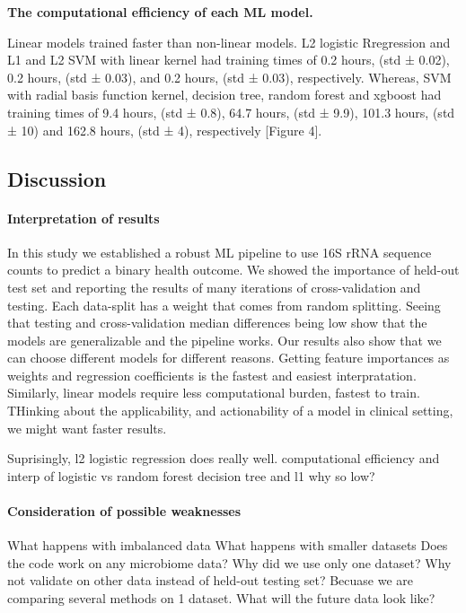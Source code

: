 \documentclass[11pt,]{article}
\let\oldparagraph\paragraph
\renewcommand{\paragraph}[1]{\oldparagraph{#1}\mbox{}}
\begin{document}
\textbf{The computational efficiency of each ML model.}

Linear models trained faster than non-linear models. L2 logistic
Rregression and L1 and L2 SVM with linear kernel had training times of
0.2 hours, (std ± 0.02), 0.2 hours, (std ± 0.03), and 0.2 hours, (std ±
0.03), respectively. Whereas, SVM with radial basis function kernel,
decision tree, random forest and xgboost had training times of 9.4
hours, (std ± 0.8), 64.7 hours, (std ± 9.9), 101.3 hours, (std ± 10) and
162.8 hours, (std ± 4), respectively {[}Figure 4{]}.

\subsection{Discussion}\label{discussion}

\paragraph{Interpretation of results}\label{interpretation-of-results}

In this study we established a robust ML pipeline to use 16S rRNA
sequence counts to predict a binary health outcome. We showed the
importance of held-out test set and reporting the results of many
iterations of cross-validation and testing. Each data-split has a weight
that comes from random splitting. Seeing that testing and
cross-validation median differences being low show that the models are
generalizable and the pipeline works. Our results also show that we can
choose different models for different reasons. Getting feature
importances as weights and regression coefficients is the fastest and
easiest interpratation. Similarly, linear models require less
computational burden, fastest to train. THinking about the
applicability, and actionability of a model in clinical setting, we
might want faster results.

Suprisingly, l2 logistic regression does really well. computational
efficiency and interp of logistic vs random forest decision tree and l1
why so low?

\paragraph{Consideration of possible
weaknesses}\label{consideration-of-possible-weaknesses}

What happens with imbalanced data What happens with smaller datasets
Does the code work on any microbiome data? Why did we use only one
dataset? Why not validate on other data instead of held-out testing set?
Becuase we are comparing several methods on 1 dataset. What will the
future data look like?
\end{document}
